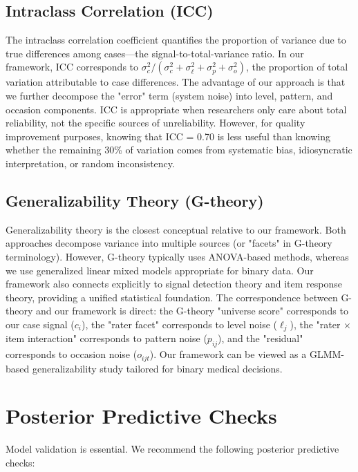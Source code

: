 \documentclass[num-refs]{wiley-article}
\begin{document}
\subsection*{Intraclass Correlation (ICC)}

The intraclass correlation coefficient quantifies the proportion of variance due to true differences among cases---the signal-to-total-variance ratio. In our framework, ICC corresponds to $\sigma_c^2 / (\sigma_c^2 + \sigma_\ell^2 + \sigma_p^2 + \sigma_o^2)$, the proportion of total variation attributable to case differences. The advantage of our approach is that we further decompose the "error" term (system noise) into level, pattern, and occasion components. ICC is appropriate when researchers only care about total reliability, not the specific sources of unreliability. However, for quality improvement purposes, knowing that ICC = 0.70 is less useful than knowing whether the remaining 30\% of variation comes from systematic bias, idiosyncratic interpretation, or random inconsistency.

\subsection*{Generalizability Theory (G-theory)}

Generalizability theory is the closest conceptual relative to our framework. Both approaches decompose variance into multiple sources (or "facets" in G-theory terminology). However, G-theory typically uses ANOVA-based methods, whereas we use generalized linear mixed models appropriate for binary data. Our framework also connects explicitly to signal detection theory and item response theory, providing a unified statistical foundation. The correspondence between G-theory and our framework is direct: the G-theory "universe score" corresponds to our case signal ($c_i$), the "rater facet" corresponds to level noise ($\ell_j$), the "rater × item interaction" corresponds to pattern noise ($p_{ij}$), and the "residual" corresponds to occasion noise ($o_{ijt}$). Our framework can be viewed as a GLMM-based generalizability study tailored for binary medical decisions.

\section*{Posterior Predictive Checks}\label{section-ppc}

Model validation is essential. We recommend the following posterior predictive checks:
\end{document}

